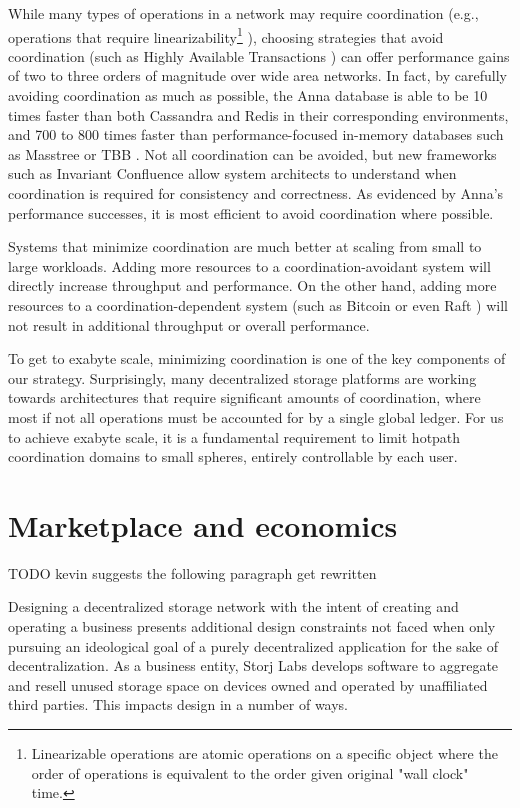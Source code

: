 \documentclass[11pt,fleqn,openany]{book}
\newcommand{\todo}[1]{{\color{red} TODO #1 }}
\begin{document}
While many types of operations in a network may require coordination
(e.g., operations that require linearizability\footnote{
Linearizable operations are atomic operations on a specific object where
the order of operations is equivalent to the order given original "wall clock"
time.
}
\cite{jepsen-consistency, hat, vv-consistency}), choosing strategies that
avoid coordination (such as Highly Available Transactions \cite{hat}) can offer
performance gains of two to three orders of magnitude over wide area networks.
In fact, by carefully avoiding coordination as much as possible, the Anna
database is able to be 10 times faster than both Cassandra and Redis in their
corresponding environments, and 700 to 800 times faster than
performance-focused in-memory databases such as Masstree or TBB
\cite{anna, anna-announce}.
Not all coordination can be avoided, but new frameworks such as Invariant
Confluence \cite{i-confluence} allow system architects to understand when
coordination is required for consistency and correctness. As evidenced
by Anna's performance successes, it is most efficient to avoid coordination
where possible.

Systems that minimize coordination are
much better at scaling from small
to large workloads. Adding more resources to a coordination-avoidant system
will directly increase throughput and performance. On the other hand,
adding more resources to a coordination-dependent system
(such as Bitcoin \cite{bitcoin} or even Raft \cite{raft}) will not result in
additional throughput or overall performance.

To get to exabyte scale, minimizing coordination is one of the key components
of our strategy.
Surprisingly, many decentralized storage platforms are working towards
architectures that require significant amounts of coordination,
where most if not all operations must be accounted for by a single global
ledger. For us to achieve exabyte scale, it is a fundamental
requirement to limit hotpath coordination domains to small spheres,
entirely controllable by each user.

\section{Marketplace and economics}

\todo{kevin suggests the following paragraph get rewritten}

Designing a decentralized storage network with the intent of creating and
operating a business presents additional design constraints not faced when only
pursuing an ideological goal of a purely decentralized application
for the sake of decentralization.
As a business entity, Storj Labs develops software to aggregate and resell
unused storage space on devices owned and operated by unaffiliated third
parties. This impacts design in a number of ways.
\end{document}
